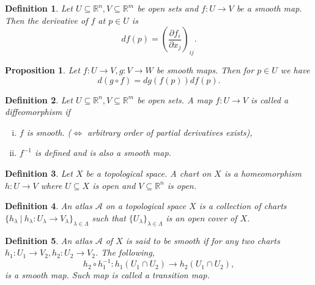 \documentclass{article}
\newtheorem{proposition}{Proposition}[section]
\newtheorem{definition}{Definition}[section]
\numberwithin{equation}{section}
\begin{document}
\begin{definition}
Let $U\subseteq\mathbb{R}^n,V\subseteq\mathbb{R}^m$ be open sets and $f:U\to V$ be a smooth map. Then the derivative of $f$ at $p\in U$ is 
\begin{equation*}
df(p) = \left({\frac {\partial f_i} {\partial x_j}}\right)_{ij}.
\end{equation*}
\end{definition}

\begin{proposition}
Let $f:U\to V, g:V\to W$ be smooth maps. Then for $p\in U$ we have
\begin{equation*}
d(g\circ f) = dg(f(p))df(p).
\end{equation*}
\end{proposition}

\begin{definition}
Let $U\subseteq\mathbb{R}^n,V\subseteq\mathbb{R}^m$ be open sets. A map $f:U\to V$ is called a diffeomorphism if 
\begin{enumerate}[i).]
\item $f$ is smooth. ($\Leftrightarrow$ arbitrary order of partial derivatives exists),
\item $f^{-1}$ is defined and is also a smooth map.
\end{enumerate}
\end{definition}

\begin{definition}
Let $X$ be a topological space. A chart on $X$ is a homeomorphism $h:U\to V$ where $U\subseteq X$ is open and $V\subseteq \mathbb{R}^n$ is open.
\end{definition}

\begin{definition}
An atlas $\mathcal{A}$ on a topological space $X$ is a collection of charts $\{h_\lambda\:|\: h_\lambda:U_\lambda\to V_\lambda\}_{\lambda\in \Lambda}$ such that
$\{U_\lambda\}_{\lambda\in\Lambda}$ is an open cover of $X$.
\end{definition}

\begin{definition}
An atlas $\mathcal{A}$ of $X$ is said to be smooth if for any two charts $h_1:U_1\to V_2,h_2:U_2\to V_2$. The following,
\begin{equation*}
h_2\circ h_1^{-1}:h_1(U_1\cap U_2)\to h_2(U_1\cap U_2),
\end{equation*}
is a smooth map. Such map is called a transition map.
\end{definition}
\end{document}
